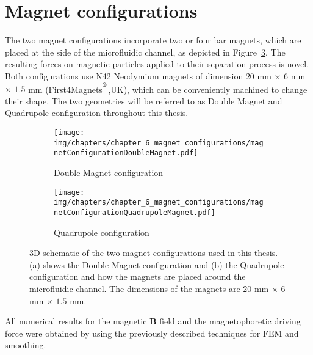 \section{Magnet configurations}\label{sec:magnetConfiguration}
The two magnet configurations incorporate two or four bar magnets, which are placed at the side of the microfluidic channel, as depicted in Figure~\ref{fig:magnetConfigurations}. The resulting forces on magnetic particles applied to their separation process is novel. Both configurations use N42 Neodymium magnets of dimension $20$ mm $\times$ $6$ mm $\times$ $1.5$ mm (First4Magnets$^\textsuperscript{\textregistered}$,UK), which can be conveniently machined to change their shape. The two geometries will be referred to as Double Magnet and Quadrupole configuration throughout this thesis. 
\begin{figure}[tb]
\centering
	\begin{subfigure}[b]{0.48\textwidth}
		\texttt{[image: img/chapters/chapter\_6\_magnet\_configurations/magnetConfigurationDoubleMagnet.pdf]}
		\caption{Double Magnet configuration}
		\label{fig:double}
    \end{subfigure}
    \hfill
	\begin{subfigure}[b]{0.48\textwidth}
		\texttt{[image: img/chapters/chapter\_6\_magnet\_configurations/magnetConfigurationQuadrupoleMagnet.pdf]}
		\caption{Quadrupole configuration}
		\label{fig:quadrupole}
	\end{subfigure}
\caption[3D Schematic of the magnet configurations]{3D schematic of the two magnet configurations used in this thesis. (a) shows the Double Magnet configuration and (b) the Quadrupole configuration and how the magnets are placed around the microfluidic channel. The dimensions of the magnets are $20$ mm $\times$ $6$ mm $\times$ $1.5$ mm.}%
\label{fig:magnetConfigurations}
\end{figure}
All numerical results for the magnetic $\mathbf{B}$ field and the magnetophoretic driving force were obtained by using the previously described techniques for FEM and smoothing.  

